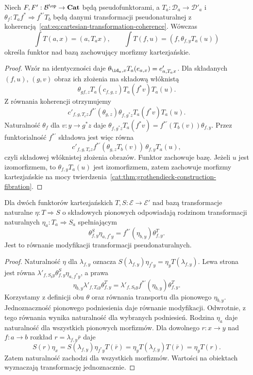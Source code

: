 \begin{stwierdzenie}\label{cat:prop:grothendieck-pseudonatural-functor}
Niech $F,F':\mathcal B^{\op}\to\mathbf{Cat}$ będą pseudofunktorami, a $T_a:\mathcal D_a\to\mathcal D'_a$ i $\theta_f:T_af^*\Rightarrow f^{*'}T_b$ będą danymi transformacji pseudonaturalnej z koherencją~\eqref{cat:eq:cartesian-transformation-coherence}. Wówczas
\[
 \int T(a,x)=(a,T_ax),\qquad
 \int T(f,u)=(f,\theta_{f,y}T_a(u))
\]
określa funktor nad bazą zachowujący morfizmy kartezjańskie.
\end{stwierdzenie}
\begin{proof}
Wzór na identyczności daje $\theta_{\id_a,x}T_a(e_{a,x})=e'_{a,T_ax}$. Dla składanych $(f,u)$, $(g,v)$ obraz ich złożenia ma składową włóknistą
\[
 \theta_{gf,z}T_a(c_{f,g,z})T_a(f^*v)T_a(u).
\]
Z równania koherencji otrzymujemy
\[
 c'_{f,g,T_cz} f^{*'}(\theta_{g,z})\theta_{f,g^*z}T_a(f^*v)T_a(u).
\]
Naturalność $\theta_f$ dla $v:y\to g^*z$ daje $\theta_{f,g^*z}T_a(f^*v)=f^{*'}(T_b(v))\theta_{f,y}$. Przez funktorialność $f^{*'}$ składowa jest więc równa
\[
 c'_{f,g,T_cz} f^{*'}(\theta_{g,z}T_b(v))\,
       \theta_{f,y}T_a(u),
\]
czyli składowej włóknistej złożenia obrazów. Funktor zachowuje bazę. Jeżeli $u$ jest izomorfizmem, to $\theta_{f,y}T_a(u)$ jest izomorfizmem, zatem zachowuje morfizmy kartezjańskie na mocy twierdzenia~\ref{cat:thm:grothendieck-construction-fibration}.
\end{proof}

\begin{stwierdzenie}\label{cat:prop:grothendieck-modifications}
Dla dwóch funktorów kartezjańskich $T,S:\mathcal E\to\mathcal E'$ nad bazą transformacje naturalne $\eta:T\Rightarrow S$ o składowych pionowych odpowiadają rodzinom transformacji naturalnych $\eta_a:T_a\Rightarrow S_a$ spełniającym
\[
 \theta^S_{f,y}\eta_{a,f^*y}
 = f^{*'}(\eta_{b,y})\theta^T_{f,y}.
\]
Jest to równanie modyfikacji transformacji pseudonaturalnych.
\end{stwierdzenie}
\begin{proof}
Naturalność $\eta$ dla $\lambda_{f,y}$ oznacza
$S(\lambda_{f,y})\eta_{f^*y}=\eta_yT(\lambda_{f,y})$.
Lewa strona jest równa $\lambda'_{f,S_by}\theta^S_{f,y}\eta_{a,f^*y}$, a prawa
\[
 \eta_{b,y}\lambda'_{f,T_by}\theta^T_{f,y}
 =\lambda'_{f,S_by}f^{*'}(\eta_{b,y})\theta^T_{f,y}.
\]
Korzystamy z definicji obu $\theta$ oraz równania transportu dla pionowego $\eta_{b,y}$. Jednoznaczność pionowego podniesienia daje równanie modyfikacji. Odwrotnie, z tego równania wynika naturalność dla wybranych podniesień. Rodzina $\eta_a$ daje naturalność dla wszystkich pionowych morfizmów. Dla dowolnego $r:x\to y$ nad $f:a\to b$ rozkład $r=\lambda_{f,y}\bar r$ daje
\[
 S(r)\eta_x=S(\lambda_{f,y})\eta_{f^*y}T(\bar r)
 =\eta_yT(\lambda_{f,y})T(\bar r)=\eta_yT(r).
\]
Zatem naturalność zachodzi dla wszystkich morfizmów. Wartości na obiektach wyznaczają transformację jednoznacznie.
\end{proof}

